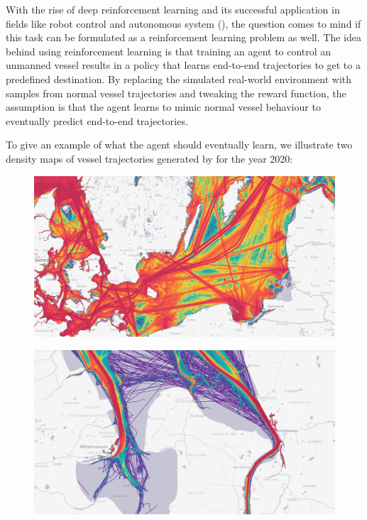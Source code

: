 \newpage
With the rise of deep reinforcement learning and its successful application in fields like robot control and autonomous system (\cite{s18092905, zare2021continuous, 9195789, martinsen2018curved}), the question comes to mind if this task can be formulated as a reinforcement learning problem as well. The idea behind using reinforcement learning is that training an agent to control an unmanned vessel results in a policy that learns end-to-end trajectories to get to a predefined destination. By replacing the simulated real-world environment with samples from normal vessel trajectories and tweaking the reward function, the assumption is that the agent learns to mimic normal vessel behaviour to eventually predict end-to-end trajectories.
\par
To give an example of what the agent should eventually learn, we illustrate two density maps of vessel trajectories generated by \cite{martinetraffic} for the year 2020:
\begin{figure}[H]
    \centering
    \begin{minipage}{.47\textwidth}
      \centering
      \includegraphics[width=\textwidth]{images/balticsea_density_routes.PNG}
      \label{fig:baltic}
    \end{minipage}
    \hspace{.05\textwidth}%
    \begin{minipage}{.47\textwidth}
        \centering
        \includegraphics[width=\textwidth]{images/bhv_jadebusen_density_routes.PNG}
        \label{fig:jadebusen}
      \end{minipage}
\end{figure}
